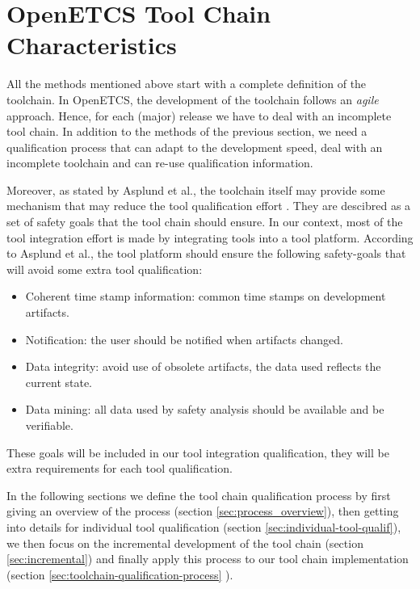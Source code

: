 \section{OpenETCS Tool Chain Characteristics}
\label{sec:toolchain-analysis}

All the methods mentioned above start with a complete definition of the toolchain. In OpenETCS, the development of the toolchain follows an \emph{agile} approach.
Hence, for each (major) release we have to deal with an incomplete tool
chain. In addition to the methods of the previous section,  we need a qualification
process that can adapt to the development speed, deal with an incomplete toolchain
and can re-use qualification information.


Moreover, as stated by Asplund et al., the toolchain itself may
provide some mechanism that may reduce the tool qualification effort
\cite{asplund_towards_2012,asplund_qualifying_2012}. They are
descibred as a set of safety goals that the tool chain should ensure.
 In our context, most of the
tool integration effort is made by integrating tools into a tool
platform.  According to Asplund et al., the tool platform should
ensure the following safety-goals that will avoid some extra tool qualification:
\begin{itemize}
\item Coherent time stamp information: common time stamps on development artifacts.
\item Notification: the user should be notified when artifacts changed.
\item Data integrity:  avoid use of obsolete artifacts, the data used reflects the
  current state.
\item Data mining: all data used by safety analysis should be available and be
  verifiable.
\end{itemize}

These goals will be included in our tool integration
qualification, they will be extra requirements for each tool qualification.

In the following sections we define the tool chain qualification
process by first giving an overview of the process (section
\ref{sec:process_overview}), then getting into details for individual
tool qualification (section \ref{sec:individual-tool-qualif}), we then
focus on the incremental development of the tool chain (section
\ref{sec:incremental}) and finally apply this process to our tool
chain implementation (section \ref{sec:toolchain-qualification-process} ).

